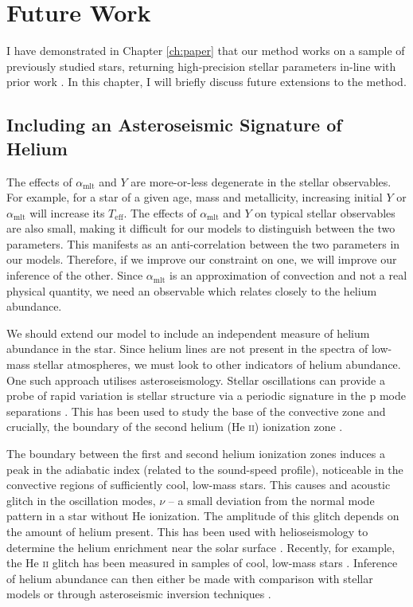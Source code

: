 \chapter{Future Work}\label{ch:future}

I have demonstrated in Chapter \ref{ch:paper} that our method works on a sample of previously studied stars, returning high-precision stellar parameters in-line with prior work \citep{Serenelli.Johnson.ea2017}. In this chapter, I will briefly discuss future extensions to the method.

\section{Including an Asteroseismic Signature of Helium}

The effects of $\alpha_\mathrm{mlt}$ and $Y$ are more-or-less degenerate in the stellar observables. For example, for a star of a given age, mass and metallicity, increasing initial $Y$ or $\alpha_\mathrm{mlt}$ will increase its $T_\mathrm{eff}$. The effects of $\alpha_\mathrm{mlt}$ and $Y$ on typical stellar observables are also small, making it difficult for our models to distinguish between the two parameters. This manifests as an anti-correlation between the two parameters in our models. Therefore, if we improve our constraint on one, we will improve our inference of the other. Since $\alpha_\mathrm{mlt}$ is an approximation of convection and not a real physical quantity, we need an observable which relates closely to the helium abundance.

We should extend our model to include an independent measure of helium abundance in the star. Since helium lines are not present in the spectra of low-mass stellar atmospheres, we must look to other indicators of helium abundance. One such approach utilises asteroseismology. Stellar oscillations can provide a probe of rapid variation is stellar structure via a periodic signature in the p mode separations \citep[see e.g.][]{Broomhall.Miglio.ea2014}. This has been used to study the base of the convective zone \citep{Monteiro.Christensen-Dalsgaard.ea2000} and crucially, the boundary of the second helium (He \textsc{ii}) ionization zone \citep{Houdek.Gough2007}.

The boundary between the first and second helium ionization zones induces a peak in the adiabatic index (related to the sound-speed profile), noticeable in the convective regions of sufficiently cool, low-mass stars. This causes and acoustic glitch in the oscillation modes, $\nu$ -- a small deviation from the normal mode pattern in a star without He ionization. The amplitude of this glitch depends on the amount of helium present. This has been used with helioseismology to determine the helium enrichment near the solar surface \citep{Basu.Antia1995, Basu.Antia2004}. Recently, for example, the He \textsc{ii} glitch has been measured in samples of cool, low-mass stars \citep{Mazumdar.Monteiro.ea2014, Corsaro.DeRidder.ea2015, Verma.Raodeo.ea2017}. Inference of helium abundance can then either be made with comparison with stellar models or through asteroseismic inversion techniques \citep[e.g. for a the 16Cyg binary star system][]{Verma.Faria.ea2014, Buldgen.Salmon.ea2016}.

